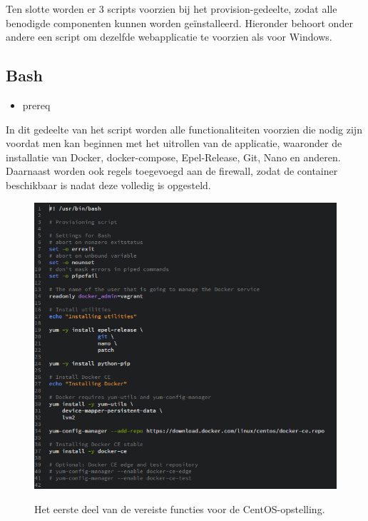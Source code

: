 Ten slotte worden er 3 scripts voorzien bij het provision-gedeelte, zodat alle benodigde componenten kunnen worden geïnstalleerd. Hieronder behoort onder andere een script om dezelfde webapplicatie te voorzien als voor Windows.

\subsection{Bash}

\begin{itemize}[noitemsep]
	\item prereq
\end{itemize}

In dit gedeelte van het script worden alle functionaliteiten voorzien die nodig zijn voordat men kan beginnen met het uitrollen van de applicatie, waaronder de installatie van Docker, docker-compose, Epel-Release, Git, Nano en anderen.
Daarnaast worden ook regels toegevoegd aan de firewall, zodat de container beschikbaar is nadat deze volledig is opgesteld.

\begin{figure}
	\centering
	\caption{Het eerste deel van de vereiste functies voor de CentOS-opstelling.}
	\includegraphics[scale=0.6]{img/centosprereq01}
	\label{centosprereq01}
\end{figure}

